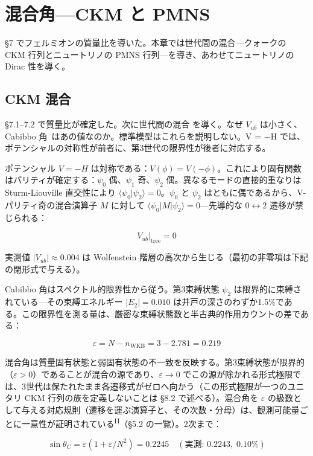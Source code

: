 \documentclass[fontsize=11pt,paper=a4,lualatex]{jlreq}
\newcommand{\PII}{\textsuperscript{\textup{II}}}
\begin{document}
\section{混合角---CKM と PMNS}

§7 でフェルミオンの質量比を導いた。本章では世代間の混合---クォークの CKM 行列とニュートリノの PMNS 行列---を導き、あわせてニュートリノの Dirac 性を導く。

\subsection{CKM 混合}\label{ckm-ux6df7ux5408}

§7.1--7.2 で質量比が確定した。次に世代間の混合 \cite{km} を導く。なぜ
$V_{ub}$ は小さく、Cabibbo
角~\cite{cabibbo}はあの値なのか。標準模型はこれらを説明しない。V = −H
では、ポテンシャルの対称性が前者に、第3世代の限界性が後者に対応する。

ポテンシャル $V = -H$ は対称である：$V(\phi) = V(-\phi)$。これにより固有関数はパリティが確定する：$\psi_0$ 偶、$\psi_1$ 奇、$\psi_2$ 偶。異なるモードの直接的重なりは Sturm-Liouville 直交性により $\langle\psi_0|\psi_2\rangle = 0$。$\psi_0$ と $\psi_2$ はともに偶であるから、V-パリティ奇の混合演算子 $M$ に対して $\langle\psi_0|M|\psi_2\rangle = 0$---先導的な $0 \leftrightarrow 2$ 遷移が禁じられる：

\[V_{ub}\big|_\mathrm{tree} = 0\]

実測値 $|V_{ub}| \approx 0.004$ は Wolfenstein 階層の高次から生じる（最初の非零項は下記の閉形式で与える）。

Cabibbo 角はスペクトル的限界性から従う。第3束縛状態 $\psi_2$ は限界的に束縛されている---その束縛エネルギー $|E_2| = 0.010$ は井戸の深さのわずか1.5\%である。この限界性を測る量は、厳密な束縛状態数と半古典的作用カウントの差である：

\[\varepsilon = N - n_\mathrm{WKB} = 3 - 2.781 = 0.219\]

混合角は質量固有状態と弱固有状態の不一致を反映する。第3束縛状態が限界的（$\varepsilon > 0$）であることが混合の源であり、$\varepsilon \to 0$ でこの源が除かれる形式極限では、3世代は保たれたまま各遷移式がゼロへ向かう（この形式極限が一つのユニタリ CKM 行列の族を定義しないことは §8.2 で述べる）。混合角を $\varepsilon$ の級数として与える対応規則（遷移を運ぶ演算子と、その次数・分母）は、観測可能量ごとに一意性が証明されている\PII{}（§5.2 の一覧）。2次まで：

\[\sin\theta_C = \varepsilon(1 + \varepsilon/N^2) = 0.2245 \quad (\text{実測: } 0.2243,\; 0.10\%)\]
\end{document}
